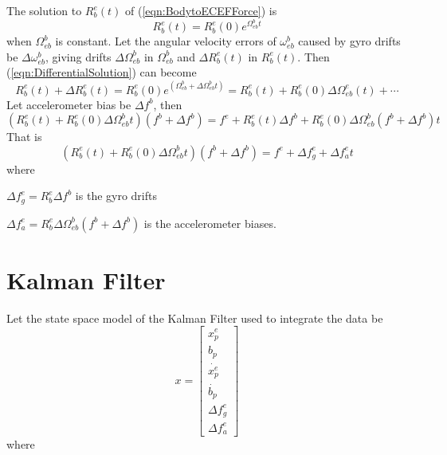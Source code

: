 \documentclass[a4paper]{report}
\numberwithin{equation}{chapter}
\begin{document}
The solution to $R^e_b \left( t \right)$ of (\ref{eqn:BodytoECEFForce}) is
\begin{equation}
R^e_b \left( t \right) = R^e_b \left( 0 \right) e^{\Omega^b_{eb} t}
\label{eqn:DifferentialSolution}
\end{equation}
when $\Omega^b_{eb}$ is constant. Let the angular velocity errors of $\omega^b_{eb}$ caused by gyro drifts be $\Delta \omega^b_{eb}$, giving drifts $\Delta \Omega^b_{eb}$ in $\Omega^b_{eb}$ and $\Delta R^e_b \left( t \right)$ in $R^e_b \left( t \right)$. Then (\ref{eqn:DifferentialSolution}) can become
\begin{equation}
R^e_b \left( t \right) + \Delta R^e_b \left( t \right) = R^e_b \left( 0 \right) e^{\left( \Omega^b_{eb} + \Delta \Omega^b_{eb} t \right)} = R^e_b \left( t \right) + R^e_b \left( 0 \right) \Delta \Omega^e_{eb} \left( t \right) + \dotsb
\end{equation}
Let accelerometer bias be $\Delta f^b$, then
\begin{equation}
\left( R^e_b \left( t \right) + R^e_b \left( 0 \right) \Delta \Omega^b_{eb} t \right) \left( f^b + \Delta f^b \right) = f^e + R^e_b \left( t \right) \Delta f^b + R^e_b \left( 0 \right) \Delta \Omega^b_{eb} \left( f^b + \Delta f^b \right) t
\end{equation}
That is
\begin{equation}
\left( R^e_b \left( t \right) + R^e_b \left( 0 \right) \Delta \Omega^b_{eb} t \right) \left( f^b + \Delta f^b \right) = f^e + \Delta f^e_g + \Delta f^e_a t
\end{equation}
where

$\Delta f^e_g = R^e_b \Delta f^b$ is the gyro drifts

$\Delta f^e_a = R^e_b \Delta \Omega^b_{eb} \left( f^b + \Delta f^b \right)$ is the accelerometer biases.


\section[Kalman Filter]{Kalman Filter}

Let the state space model of the Kalman Filter used to integrate the data be
\begin{equation}
x =
\begin{bmatrix}
x^e_p\\
b_p\\
\dot{x^e_p}\\
\dot{b_p}\\
\Delta f^e_g\\
\Delta f^e_a
\end{bmatrix}
\label{StateSpaceModel}
\end{equation}
where
\end{document}
